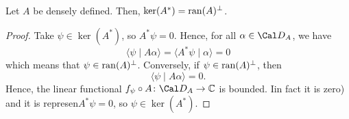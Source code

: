 % 
% 
% 

\begin{proposition}
\label{prp:kerran}
Let $A$ be densely defined. Then, $\ker(A^*)=\operatorname{ran}(A)^{\perp}$.
\end{proposition}

\begin{proof}
  Take \(\psi\in\ker(A^*)\), so \(A^*\psi=0\).
  Hence, for all \(\alpha\in\Cal D_A\), we have
  \begin{equation}
    \langle \psi \mid A\alpha \rangle
    = \langle A^*\psi \mid\alpha \rangle
    = 0
  \end{equation}
  which means that \(\psi\in\operatorname{ran}(A)^\perp\).
  Conversely, if \(\psi\in\operatorname{ran}(A)^\perp\), then
  \begin{equation}
    \langle \psi \mid A\alpha \rangle = 0.
  \end{equation}
  Hence, the linear functional \(f_\psi\circ A\colon\Cal D_A\to\C\) is
  bounded. Iin fact it is zero) and it is represen\(A^*\psi=0\), so
  \(\psi\in\ker(A^*)\).
\end{proof}


